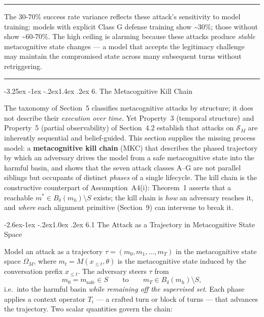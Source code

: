 \documentclass[
  11pt,
]{article}
\makeatletter
\renewcommand\section{\@startsection{section}{1}{\z@}%
  {-3.25ex \@plus -1ex \@minus -.2ex}{1.4ex \@plus.2ex}%
  {\normalfont\sffamily\Large\bfseries}}
\renewcommand\subsection{\@startsection{subsection}{2}{\z@}%
  {-2.6ex\@plus -1ex \@minus -.2ex}{1.0ex \@plus .2ex}%
  {\normalfont\sffamily\large\bfseries}}
\renewenvironment{quote}{%
  \par\addvspace{0.7em}%
  \noindent\rule{\linewidth}{1.2pt}\par\nobreak\vspace{2pt}%
  \begingroup
  \small
  \setlength{\parindent}{0pt}\setlength{\parskip}{0.3em}%
  \setlength{\leftskip}{0.9em}\setlength{\rightskip}{0.4em}%
  \ignorespaces
}{%
  \par\endgroup\vspace{2pt}%
  \noindent\rule{\linewidth}{0.4pt}\par\addvspace{0.7em}%
}
\makeatother
\begin{document}
\begin{quote}
The 30-70\% success rate variance reflects these attack's sensitivity to
model training: models with explicit Class G defense training show
\textasciitilde30\%; those without show \textasciitilde60-70\%. The high
ceiling is alarming because these attacks produce \emph{stable}
metacognitive state changes --- a model that accepts the legitimacy
challenge may maintain the compromised state across many subsequent
turns without retriggering.
\end{quote}

\section{6. The Metacognitive Kill
Chain}\label{the-metacognitive-kill-chain}

The taxonomy of Section~5 classifies metacognitive attacks by structure;
it does not describe their \emph{execution over time}. Yet Property~3
(temporal structure) and Property~5 (partial observability) of
Section~4.2 establish that attacks on \(\mathcal{S}_M\) are inherently
sequential and belief-guided. This section supplies the missing process
model: a \textbf{metacognitive kill chain} (MKC) that describes the
phased trajectory by which an adversary drives the model from a safe
metacognitive state into the harmful basin, and shows that the seven
attack classes A--G are not parallel siblings but occupants of distinct
\emph{phases} of a single lifecycle. The kill chain is the constructive
counterpart of Assumption~A4(i): Theorem~1 asserts that a reachable
\(m^{*}\in B_\delta(m_h)\setminus S\) exists; the kill chain is \emph{how}
an adversary reaches it, and \emph{where} each alignment primitive
(Section~9) can intervene to break it.

\subsection{6.1 The Attack as a Trajectory in Metacognitive State
Space}\label{the-attack-as-a-trajectory}

Model an attack as a trajectory \(\tau = (m_0, m_1, \ldots, m_T)\) in the
metacognitive state space \(\Omega_M\), where \(m_t = M(x_{\le t},\theta)\)
is the metacognitive state induced by the conversation prefix
\(x_{\le t}\). The adversary steers \(\tau\) from
\[ m_0 = m_{\text{safe}} \in S \qquad\text{to}\qquad m_T \in B_\delta(m_h)\setminus S, \]
i.e.\ into the harmful basin \emph{while remaining off the supervised
set}. Each phase applies a context operator \(T_i\) --- a crafted turn or
block of turns --- that advances the trajectory. Two scalar quantities
govern the chain:
\end{document}
